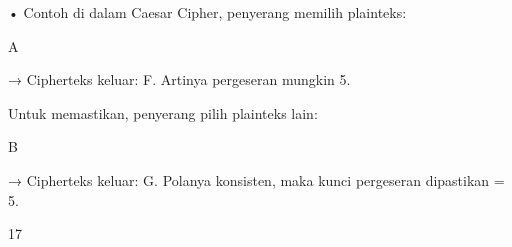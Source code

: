 \documentclass{article}
\begin{document}

• Contoh di dalam Caesar Cipher, penyerang memilih plainteks: 

              A

   → Cipherteks keluar: F.  Artinya pergeseran mungkin 5.

   Untuk memastikan, penyerang pilih plainteks lain:

           B

   → Cipherteks keluar: G. Polanya konsisten, maka kunci pergeseran dipastikan = 5.

17
\end{document}
